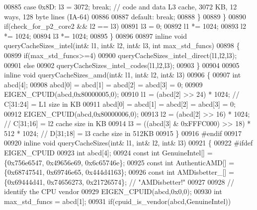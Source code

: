 \begin{DoxyCode}
{00885       \textcolor{keywordflow}{case} 0x8D: l3 = 3072; \textcolor{keywordflow}{break};   \textcolor{comment}{// code and data L3 cache, 3072 KB, 12 ways, 128 byte lines (IA-64)}
00886 
00887       \textcolor{keywordflow}{default}: \textcolor{keywordflow}{break};
00888     \}
00889   \}
00890   \textcolor{keywordflow}{if}(check\_for\_p2\_core2 && l2 == l3)
00891     l3 = 0;
00892   l1 *= 1024;
00893   l2 *= 1024;
00894   l3 *= 1024;
00895 \}
00896 
00897 \textcolor{keyword}{inline} \textcolor{keywordtype}{void} queryCacheSizes\_intel(\textcolor{keywordtype}{int}& l1, \textcolor{keywordtype}{int}& l2, \textcolor{keywordtype}{int}& l3, \textcolor{keywordtype}{int} max\_std\_funcs)
00898 \{
00899   \textcolor{keywordflow}{if}(max\_std\_funcs>=4)
00900     queryCacheSizes\_intel\_direct(l1,l2,l3);
00901   \textcolor{keywordflow}{else}
00902     queryCacheSizes\_intel\_codes(l1,l2,l3);
00903 \}
00904 
00905 \textcolor{keyword}{inline} \textcolor{keywordtype}{void} queryCacheSizes\_amd(\textcolor{keywordtype}{int}& l1, \textcolor{keywordtype}{int}& l2, \textcolor{keywordtype}{int}& l3)
00906 \{
00907   \textcolor{keywordtype}{int} abcd[4];
00908   abcd[0] = abcd[1] = abcd[2] = abcd[3] = 0;
00909   EIGEN\_CPUID(abcd,0x80000005,0);
00910   l1 = (abcd[2] >> 24) * 1024; \textcolor{comment}{// C[31:24] = L1 size in KB}
00911   abcd[0] = abcd[1] = abcd[2] = abcd[3] = 0;
00912   EIGEN\_CPUID(abcd,0x80000006,0);
00913   l2 = (abcd[2] >> 16) * 1024; \textcolor{comment}{// C[31;16] = l2 cache size in KB}
00914   l3 = ((abcd[3] & 0xFFFC000) >> 18) * 512 * 1024; \textcolor{comment}{// D[31;18] = l3 cache size in 512KB}
00915 \}
00916 \textcolor{preprocessor}{#endif}
00917 
00920 \textcolor{keyword}{inline} \textcolor{keywordtype}{void} queryCacheSizes(\textcolor{keywordtype}{int}& l1, \textcolor{keywordtype}{int}& l2, \textcolor{keywordtype}{int}& l3)
00921 \{
00922 \textcolor{preprocessor}{  #ifdef EIGEN\_CPUID}
00923   \textcolor{keywordtype}{int} abcd[4];
00924   \textcolor{keyword}{const} \textcolor{keywordtype}{int} GenuineIntel[] = \{0x756e6547, 0x49656e69, 0x6c65746e\};
00925   \textcolor{keyword}{const} \textcolor{keywordtype}{int} AuthenticAMD[] = \{0x68747541, 0x69746e65, 0x444d4163\};
00926   \textcolor{keyword}{const} \textcolor{keywordtype}{int} AMDisbetter\_[] = \{0x69444d41, 0x74656273, 0x21726574\}; \textcolor{comment}{// "AMDisbetter!"}
00927 
00928   \textcolor{comment}{// identify the CPU vendor}
00929   EIGEN\_CPUID(abcd,0x0,0);
00930   \textcolor{keywordtype}{int} max\_std\_funcs = abcd[1];
00931   \textcolor{keywordflow}{if}(cpuid\_is\_vendor(abcd,GenuineIntel))
}
\end{DoxyCode}
